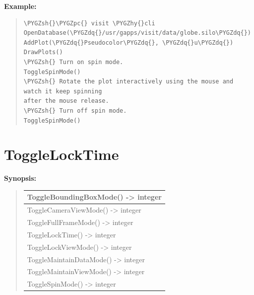 \documentclass[letterpaper,10pt,english]{sphinxmanual}
\def\PYGZsh{\char`\#}
\def\PYGZpc{\char`\%}
\def\PYGZhy{\char`\-}
\def\PYGZdq{\char`\"}
\begin{document}
\begin{DUlineblock}{0em}
\item[] \textbf{Example:}
\item[] 
\end{DUlineblock}
\begin{quote}

\begin{Verbatim}[commandchars=\\\{\}]
\PYGZsh{}\PYGZpc{} visit \PYGZhy{}cli
OpenDatabase(\PYGZdq{}/usr/gapps/visit/data/globe.silo\PYGZdq{})
AddPlot(\PYGZdq{}Pseudocolor\PYGZdq{}, \PYGZdq{}u\PYGZdq{})
DrawPlots()
\PYGZsh{} Turn on spin mode.
ToggleSpinMode()
\PYGZsh{} Rotate the plot interactively using the mouse and watch it keep spinning
after the mouse release.
\PYGZsh{} Turn off spin mode.
ToggleSpinMode()
\end{Verbatim}
\end{quote}


\section{ToggleLockTime}
\label{functions:togglelocktime}
\begin{DUlineblock}{0em}
\item[] \textbf{Synopsis:}
\end{DUlineblock}
\begin{quote}

\begin{tabulary}{\linewidth}{|L|}
\hline

ToggleBoundingBoxMode() -\textgreater{} integer
\\
\hline
ToggleCameraViewMode() -\textgreater{} integer
\\
\hline
ToggleFullFrameMode() -\textgreater{} integer
\\
\hline
ToggleLockTime() -\textgreater{} integer
\\
\hline
ToggleLockViewMode() -\textgreater{} integer
\\
\hline
ToggleMaintainDataMode() -\textgreater{} integer
\\
\hline
ToggleMaintainViewMode() -\textgreater{} integer
\\
\hline
ToggleSpinMode() -\textgreater{} integer
\\
\hline\end{tabulary}

\end{quote}
\end{document}
